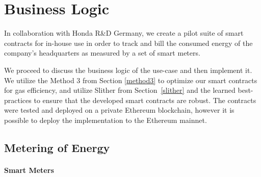 
\section{Business Logic} \label{business-logic}
In collaboration with Honda R\&D Germany, we create a pilot suite of smart contracts for in-house use in order to track and bill the consumed energy of the company's headquarters as measured by a set of smart meters. 

We proceed to discuss the business logic of the use-case and then implement it. We utilize the Method 3 from Section \ref{method3} to optimize our smart contracts for gas efficiency, and utilize Slither from Section~\ref{slither} and the learned best-practices to ensure that the developed smart contracts are robust. The contracts were tested and deployed on a private Ethereum blockchain, however it is possible to deploy the implementation to the Ethereum mainnet.


\subsection{Metering of Energy} \label{metering}

\paragraph{Smart Meters}

